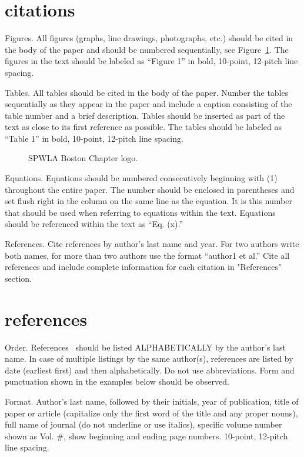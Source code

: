 \documentclass[10pt,twocolumn,twoside]{article}
\begin{document}
\section{citations}

Figures. All figures (graphs, line drawings, photographs, etc.) should be cited in the body of the paper and should be numbered sequentially, see Figure~\ref{fig:logo}. The figures in the text should be labeled as “Figure 1” in bold, 10-point, 12-pitch line spacing.

Tables. All tables should be cited in the body of the paper. Number the tables sequentially as they appear in the paper and include a caption consisting of the table number and a brief description. Tables should be inserted as part of the text as close to its first reference as possible. The tables should be labeled as “Table 1” in bold, 10-point, 12-pitch line spacing.

\begin{figure}
	\centering
	\caption{SPWLA Boston Chapter logo.}
	\label{fig:logo}
\end{figure}


Equations. Equations should be numbered consecutively beginning with (1) throughout the entire paper. The number should be enclosed in parentheses and set flush right in the column on the same line as the equation. It is this number that should be used when referring to equations within the text. Equations should be referenced within the text as “Eq. (x).”

References. Cite references by author’s last name and year. For two authors write both names, for more than two authors use the format “author1 et al.” Cite all references and include complete information for each citation in "References" section.

\section{references}

Order. References~\citep{Archie1942} should be listed ALPHABETICALLY by the author’s last name. In case of multiple listings by the same author(s), references are listed by date (earliest first) and then alphabetically. Do not use abbreviations. Form and punctuation shown in the examples below should be observed.

Format. Author's last name, followed by their initials, year of publication, title of paper or article (capitalize only the first word of the title and any proper nouns), full name of journal (do not underline or use italics), specific volume number shown as Vol. \#, show beginning and ending page numbers. 10-point, 12-pitch line spacing.
\end{document}
